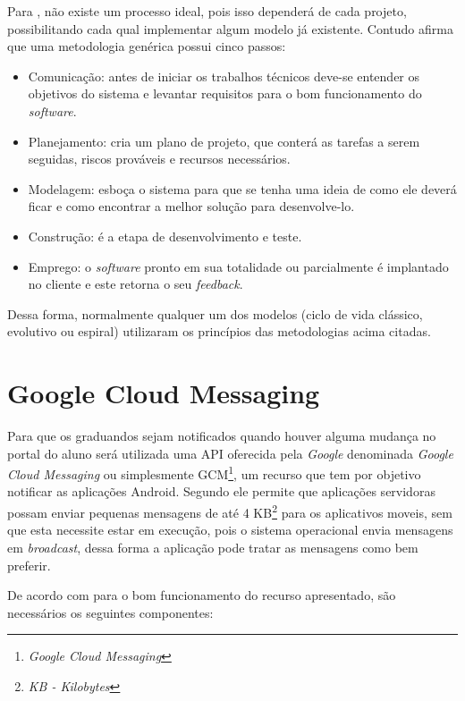 	\par Para , não existe um processo ideal, pois isso
dependerá de cada projeto, possibilitando cada qual implementar algum modelo já
existente. Contudo  afirma que uma metodologia
genérica possui cinco passos:
	\begin{itemize}
	  
	  \item Comunicação: antes de iniciar os trabalhos técnicos deve-se entender
	  os objetivos do sistema e levantar requisitos para o bom funcionamento do
	  \textit{software}.
	  
	  \item Planejamento: cria um plano de projeto, que conterá as tarefas a
	  serem seguidas, riscos prováveis e recursos necessários.
	  
	  \item Modelagem: esboça o sistema para que se tenha uma ideia de como ele
	  deverá ficar e como encontrar a melhor solução para desenvolve-lo.
	  
	  \item Construção: é a etapa de desenvolvimento e teste.
	  
	  \item Emprego: o \textit{software} pronto em sua totalidade ou parcialmente
	  é implantado no cliente e este retorna o seu \textit{feedback}.
	 
	 \end{itemize}
	 
	 \par Dessa forma, normalmente qualquer um dos modelos (ciclo de vida clássico,
evolutivo ou espiral) utilizaram os princípios das metodologias acima citadas.
	
\section{\textbf{Google Cloud 	Messaging}}

	\par Para que os graduandos sejam notificados quando houver alguma mudança no
portal do aluno será utilizada uma API oferecida pela \textit{Google}
denominada \textit{Google Cloud Messaging} ou simplesmente
GCM\footnote{\textit{Google Cloud Messaging}}, um recurso que tem por objetivo
notificar as aplicações Android. Segundo  ele permite que
aplicações servidoras possam enviar pequenas mensagens de até 4
KB\footnote{\textit{KB - Kilobytes}} para os aplicativos moveis, sem que esta
necessite estar em execução, pois o sistema operacional envia mensagens em
\textit{broadcast}, dessa forma a aplicação pode tratar as mensagens como bem
preferir.
	\par De acordo com  para o bom funcionamento do recurso
apresentado, são necessários os seguintes componentes:

